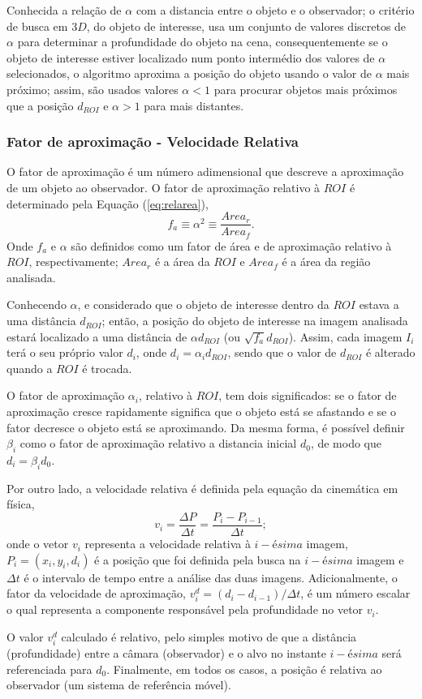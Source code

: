 Conhecida a relação de $\alpha$ com a distancia entre o objeto e o observador; 
o critério de busca em $3D$, do objeto de interesse, usa um conjunto de valores 
discretos de $\alpha$ para determinar a profundidade do objeto na cena, 
consequentemente se o objeto de interesse estiver localizado num ponto intermédio dos valores
de $\alpha$ selecionados, o algoritmo aproxima a posição do objeto 
usando o valor de $\alpha$ mais próximo; assim, são usados valores $\alpha<1$
para procurar objetos mais próximos que a posição $d_{ROI}$ e  $\alpha>1$ para mais distantes.



\subsubsection{Fator de aproximação - Velocidade Relativa}

O fator de aproximação é um número adimensional que descreve a
aproximação de um objeto ao observador.
O fator de aproximação relativo à $ROI$ é determinado pela Equação (\ref{eq:relarea}),
\begin{equation}\label{eq:relarea}
f_a \equiv \alpha^2 \equiv \frac{Area_r}{Area_f}.
\end{equation}
Onde $f_a$ e $\alpha$ são definidos como um fator de área e de aproximação relativo à $ROI$,
respectivamente; $Area_r$ é a área da $ROI$ e $Area_f$ é a área da região analisada.

Conhecendo $\alpha$, e considerado que o objeto de interesse dentro da $ROI$ estava a uma distância $d_{ROI}$; então,
a posição do objeto de interesse na imagem analisada 
estará localizado a uma distância de $\alpha d_{ROI}$ (ou $\sqrt{f_a} d_{ROI}$). Assim, cada  imagem $I_i$
terá o seu próprio  valor $d_i$, onde $d_i=\alpha_i d_{ROI}$, sendo que o valor de $d_{ROI}$
é alterado quando a $ROI$ é trocada.

O fator de aproximação $\alpha_i$, relativo à $ROI$, tem 
dois significados: se o fator de aproximação cresce rapidamente 
significa que o objeto está se afastando e se o fator decresce o objeto está se aproximando.
Da mesma forma, é possível definir $\beta_i$ como o fator de aproximação relativo
a distancia inicial $d_0$, de modo que $d_i=\beta_i d_0$.

Por outro lado, a velocidade relativa é definida pela equação da cinemática em física,
\begin{equation}
 v_i = \frac{\Delta P}{\Delta t}= \frac{P_i-P_{i-1}}{\Delta t};
\end{equation}
onde o vetor $v_i$ representa a velocidade relativa à $i-ésima$ imagem, $P_i=(x_i,y_i,d_i)$ é a posição que
foi definida pela busca na $i-ésima$ imagem e $\Delta t$ é o intervalo de tempo entre a análise das duas imagens.
Adicionalmente, o fator da velocidade de aproximação, $v^d_i=(d_i-d_{i-1})/{\Delta t}$, 
é um número escalar o qual representa a componente
responsável pela profundidade no vetor $v_i$.

O valor $v^d_i$ calculado é relativo, pelo simples motivo de que a distância (profundidade) entre a câmara 
(observador) e o alvo no instante $i-ésima$ será referenciada para $d_0$. 
Finalmente, em todos os casos, a posição é 
relativa ao observador (um sistema de referência móvel).

